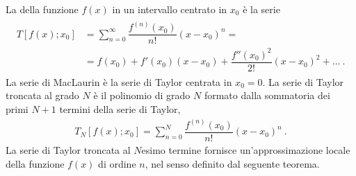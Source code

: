 \documentclass[letterpaper,10pt,italian]{jupyterBook}
\begin{document}
\sphinxAtStartPar
La  della funzione \(f(x)\) in un intervallo centrato in \(x_0\) è la serie
\begin{equation*}
\begin{split}\begin{aligned}
  T[f(x); x_0] & = \sum_{n=0}^{\infty} \dfrac{f^{(n)}(x_0)}{n!} (x-x_0)^n = \\
       & = f(x_0) + f'(x_0) (x-x_0) + \dfrac{f''(x_0)^2}{2!} (x-x_0)^2 + \dots \ .
\end{aligned}\end{split}
\end{equation*}
\sphinxAtStartPar
La serie di MacLaurin è la serie di Taylor centrata in \(x_0 = 0\). La serie di Taylor troncata al grado \(N\) è il polinomio di grado \(N\) formato dalla sommatoria dei primi \(N+1\) termini della serie di Taylor,
\begin{equation*}
\begin{split}T_N[f(x); x_0] = \sum_{n=0}^{N} \dfrac{f^{(n)}(x_0)}{n!} (x-x_0)^n \ .\end{split}
\end{equation*}
\sphinxAtStartPar
La serie di Taylor troncata al \(N\)\sphinxhyphen{}esimo termine fornisce un’approssimazione locale della funzione \(f(x)\) di ordine \(n\), nel senso definito dal seguente teorema.
\label{ch/infinitesimal_calculus/derivatives:thm:infinitesimal-calculus:derivatives:taylor}
\end{document}
